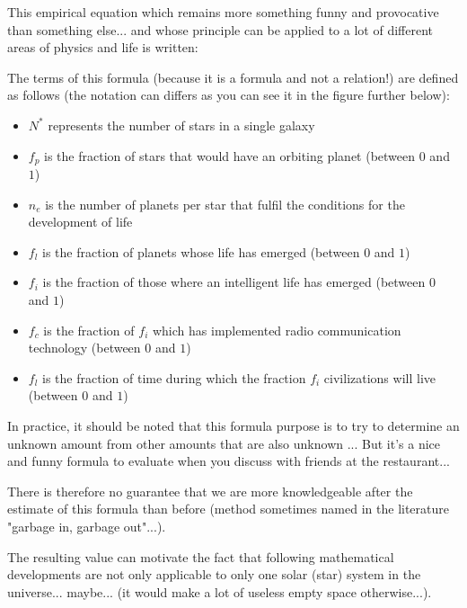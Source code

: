 	This empirical equation which remains more something funny and provocative than something else... and  whose principle can be applied to a lot of different areas of physics and life is written:
	
	The terms of this formula (because it is a formula and not a relation!) are defined as follows (the notation can differs as you can see it in the figure further below):
	\begin{itemize}
		\item $N^{*}$ represents the number of stars in a single galaxy
		\item $f_p$ is the fraction of stars that would have an orbiting planet (between $0$ and $1$)
		\item $n_e$ is the number of planets per star that fulfil the conditions for the development of life
		\item $f_l$ is the fraction of planets whose life has emerged (between $0$ and $1$)
		\item $f_i$ is the fraction of those where an intelligent life has emerged (between $0$ and $1$)
		\item $f_c$ is the fraction of $f_i$ which has implemented radio communication technology (between $0$ and $1$)
		\item $f_l$ is the fraction of time during which the fraction $f_i$ civilizations will live (between $0$ and $1$)
	\end{itemize}
	In practice, it should be noted that this formula purpose is to try to determine an unknown amount from other amounts that are also unknown ... But it's a nice and funny formula to evaluate when you discuss with friends at the restaurant...
	
	There is therefore no guarantee that we are more knowledgeable after the estimate of this formula than before (method sometimes named in the literature "garbage in, garbage out"...).
	
	The resulting value can motivate the fact that following mathematical developments are not only applicable to only one solar (star) system in the universe... maybe... (it would make a lot of useless empty space otherwise...).
	
